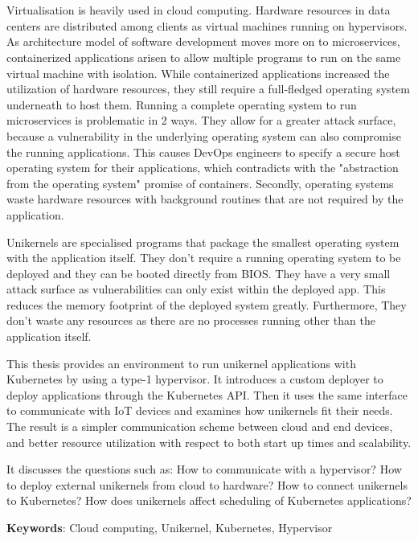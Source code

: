 \chapter{\abstractname}

Virtualisation is heavily used in cloud computing. Hardware resources in data centers are distributed among clients as virtual machines running on hypervisors. As architecture model of software development moves more on to microservices, containerized applications arisen to allow multiple programs to run on the same virtual machine with isolation. While containerized applications increased the utilization of hardware resources, they still require a full-fledged operating system underneath to host them.
Running a complete operating system to run microservices is problematic in 2 ways. They allow for a greater attack surface, because a vulnerability in the underlying operating system can also compromise the running applications. This causes DevOps engineers to specify a secure host operating system for their applications, which contradicts with the "abstraction from the operating system" promise of containers. Secondly, operating systems waste hardware resources with background routines that are not required by the application.

Unikernels are specialised programs that package the smallest operating system with the application itself. They don't require a running operating system to be deployed and they can be booted directly from BIOS. They have a very small attack surface as vulnerabilities can only exist within the deployed app. This reduces the memory footprint of the deployed system greatly. Furthermore, They don't waste any resources as there are no processes running other than the application itself.

This thesis provides an environment to run unikernel applications with Kubernetes by using a type-1 hypervisor. It introduces a custom deployer to deploy applications through the Kubernetes API. Then it uses the same interface to communicate with IoT devices and examines how unikernels fit their needs. The result is a simpler communication scheme between cloud and end devices, and better resource utilization with respect to both start up times and scalability.

It discusses the questions such as: How to communicate with a hypervisor? How to deploy external unikernels from cloud to hardware? How to connect unikernels to Kubernetes? How does unikernels affect scheduling of Kubernetes applications?

\textbf{Keywords}: Cloud computing, Unikernel, Kubernetes, Hypervisor
